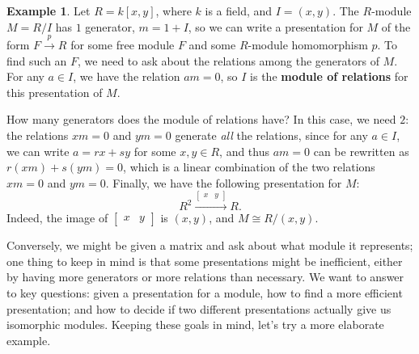 \documentclass[12pt]{report}
\numberwithin{equation}{section}
\numberwithin{theorem}{chapter}
\theoremstyle{definition}
\newtheorem{example}[theorem]{Example}
\newtheorem*{basic properties}{Basic Properties}
\newtheorem*{Important Remark}{Important Remark}
\newcommand{\df}[1]{{\bf #1}\index{#1}}
\begin{document}
\begin{example}
	Let $R = k[x,y]$, where $k$ is a field, and $I = (x,y)$. The $R$-module $M = R/I$ has $1$ generator, $m = 1+I$, so we can write a presentation for $M$ of the form $F \xrightarrow{p} R$ for some free module $F$ and some $R$-module homomorphism $p$. To find such an $F$, we need to ask about the relations among the generators of $M$. For any $a \in I$, we have the relation $am = 0$, so $I$ is the \df{module of relations} for this presentation of $M$. 
	
	How many generators does the module of relations have? In this case, we need $2$: the relations $xm = 0$ and $ym=0$ generate \emph{all} the relations, since for any $a \in I$, we can write $a = rx+sy$ for some $x, y \in R$, and thus $am = 0$ can be rewritten as $r(xm) + s(ym) = 0$, which is a linear combination of the two relations $xm=0$ and $ym=0$. Finally, we have the following presentation for $M$:
	$$R^2 \xrightarrow{\begin{bmatrix} x & y \end{bmatrix}} R.$$
	Indeed, the image of $\begin{bmatrix} x & y \end{bmatrix}$ is $(x,y)$, and $M \cong R/(x,y)$.
\end{example}


Conversely, we might be given a matrix and ask about what module it represents; one thing to keep in mind is that some presentations might be inefficient, either by having more generators or more relations than necessary. We want to answer to key questions: given a presentation for a module, how to find a more efficient presentation; and how to decide if two different presentations actually give us isomorphic modules. Keeping these goals in mind, let's try a more elaborate example.
 
\end{document}

